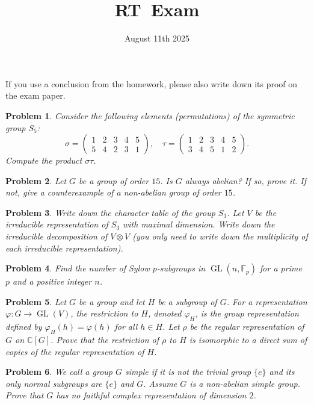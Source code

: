 \documentclass{article}
\title{RT\ Exam}
\date{August 11th 2025}
\newtheorem{ex}{Problem}
\newcommand{\C}{\mathbb{C}}
\newcommand{\F}{\mathbb{F}}
\newcommand{\GL}{\operatorname{GL}}
\begin{document}
\maketitle    

If you use a conclusion from the homework, please also write down its proof on the exam paper.

\begin{ex}
    Consider the following elements (permutations) of the symmetric group $S_5$:
    \[\sigma = \begin{pmatrix}
    1 & 2 & 3 & 4 & 5 \\
    5 & 4 & 2 & 3 & 1
    \end{pmatrix}, \quad \tau = \begin{pmatrix}
    1 & 2 & 3 & 4 & 5 \\ 
    3 & 4 & 5 & 1 & 2
    \end{pmatrix}.\]
   Compute the product $\sigma \tau$.
\end{ex}

\begin{ex}
 Let $G$ be a group of order $15$. Is $G$ always abelian? If so, prove it. If not, give a counterexample of a non-abelian group of order $15$.
\end{ex}

\begin{ex}
Write down the character table of the group $S_3$. Let $V$ be the irreducible representation of $S_3$ with maximal dimension. Write down the irreducible decomposition of $V \otimes V$ (you only need to write down the multiplicity of each irreducible representation).
\end{ex}

\begin{ex}  
  Find the number of Sylow $p$-subgroups in $\GL(n, \F_p)$ for a prime $p$ and a positive integer $n$.
\end{ex}


\begin{ex}
    Let $G$ be a group and let $H$ be a subgroup of $G$. For a representation $\varphi\colon G\to \GL(V)$, the restriction to $H$, denoted $\varphi_H$, is the group representation defined by $\varphi_H(h)=\varphi(h)$ for all $h\in H$. Let $\rho$ be the regular representation of $G$ on $\C[G]$. Prove that the restriction of $\rho$ to $H$ is isomorphic to a direct sum of copies of the regular representation of $H$.
\end{ex}
  

\begin{ex}
  We call a group $G$ simple if it is not the trivial group $\{e\}$ and its only normal subgroups are $\{e\}$ and $G$. Assume $G$ is a non-abelian simple group. Prove that $G$ has no faithful complex representation of dimension $2$.
\end{ex}
\end{document}
